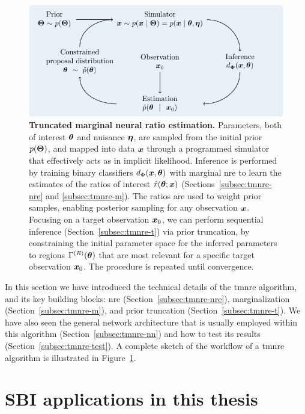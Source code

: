 \begin{figure}
	\centering
	\includegraphics[width=\linewidth]{TikZ/tmnre.pdf}
	\caption{\textbf{Truncated marginal neural ratio estimation.} Parameters, both of interest $\bm{\theta}$ and nuisance $\bm{\eta}$, are sampled from the initial prior $p(\bm{\Theta})$, and mapped into data $\bm{x}$ through a programmed simulator that effectively acts as in implicit likelihood. Inference is performed by training binary classifiers $d_\Phi(\bm{x}, \bm{\theta})$ with marginal \gls*{nre} to learn the estimates of the ratios of interest $\hat{r}(\bm{\theta};\bm{x})$ (Sections~\ref{subsec:tmnre-nre} and \ref{subsec:tmnre-m}). The ratios are used to weight prior samples, enabling posterior sampling for any observation $\bm{x}$. Focusing on a target observation $\bm{x}_0$, we can perform sequential inference (Section~\ref{subsec:tmnre-t}) via prior truncation, by constraining the initial parameter space for the inferred parameters to regions $\Gamma^{(R)}(\bm{\theta})$ that are most relevant for a specific target observation $\bm{x}_0$. The procedure is repeated until convergence.
}
	\label{fig:sbi-tmnre}
\end{figure}

In this section we have introduced the technical details of the \gls*{tmnre} algorithm, and its key building blocks: \gls*{nre} (Section~\ref{subsec:tmnre-nre}), marginalization  (Section~\ref{subsec:tmnre-m}), and prior truncation  (Section~\ref{subsec:tmnre-t}). We have also seen the general network architecture that is usually employed within this algorithm (Section~\ref{subsec:tmnre-nn}) and how to test its results (Section~\ref{subsec:tmnre-test}). A complete sketch of the workflow of a \gls*{tmnre} algorithm is illustrated in Figure~\ref{fig:sbi-tmnre}.


\section{SBI applications in this thesis} \label{sec:applications}


